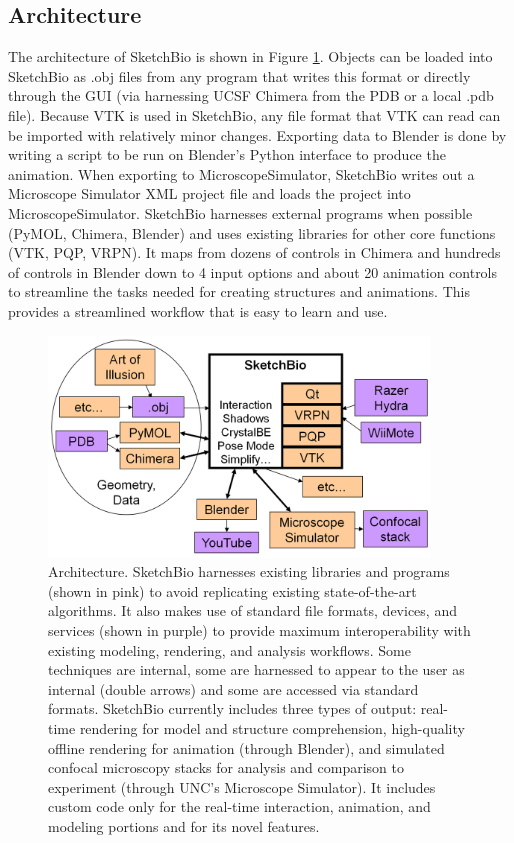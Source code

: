 \documentclass[twocolumn]{bmcart}%
\begin{document}
\subsection*{Architecture}

The architecture of SketchBio is shown in Figure \ref{fig:architecture}.  Objects can be loaded into SketchBio as .obj files from any program that writes this format or directly through the GUI (via harnessing UCSF Chimera from the PDB or a local .pdb file).  Because VTK is used in SketchBio, any file format that VTK can read can be imported with relatively minor changes.  Exporting data to Blender is done by writing a script to be run on Blender's Python interface to produce the animation.  When exporting to MicroscopeSimulator, SketchBio writes out a Microscope Simulator XML project file and loads the project into MicroscopeSimulator.  SketchBio harnesses external programs when possible (PyMOL, Chimera, Blender) and uses existing libraries for other core functions (VTK, PQP, VRPN).  It maps from dozens of controls in Chimera and hundreds of controls in Blender down to 4 input options and about 20 animation controls to streamline the tasks needed for creating structures and animations.  This provides a streamlined workflow that is easy to learn and use.

\begin{figure}[ht]
    \begin{center}
    \noindent\includegraphics[width=0.9\textwidth]
    {system_diagram.png}
    \end{center}
\caption{Architecture.  SketchBio harnesses existing libraries and programs (shown in pink) to avoid replicating existing state-of-the-art algorithms.  It also makes use of standard file formats, devices, and services (shown in purple) to provide maximum interoperability with existing modeling, rendering, and analysis workflows.  Some techniques are internal, some are harnessed to appear to the user as internal (double arrows) and some are accessed via standard formats.  SketchBio currently includes three types of output: real-time rendering for model and structure comprehension, high-quality offline rendering for animation (through Blender), and simulated confocal microscopy stacks for analysis and comparison to experiment (through UNC's Microscope Simulator).  It includes custom code only for the real-time interaction, animation, and modeling portions and for its novel features.}
\label{fig:architecture}
\end{figure}
\end{document}
